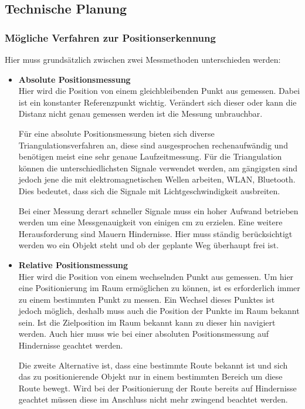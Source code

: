 \needspace{2cm}
  \subsection{Technische Planung}
    \subsubsection{Mögliche Verfahren zur Positionserkennung}
    Hier muss grundsätzlich zwischen zwei Messmethoden unterschieden werden:
    \begin{itemize}
      \item \textbf{Absolute Positionsmessung}\\
      Hier wird die Position von einem gleichbleibenden Punkt aus gemessen. Dabei ist ein konstanter Referenzpunkt wichtig.
      Verändert sich dieser oder kann die Distanz nicht genau gemessen werden ist die Messung unbrauchbar.

      Für eine absolute Positionsmessung bieten sich diverse Triangulationsverfahren an,
      diese sind ausgesprochen rechenaufwändig und benötigen meist eine sehr genaue Laufzeitmessung.
      Für die Triangulation können die unterschiedlichsten Signale verwendet werden, am gängigsten sind jedoch jene die mit elektromagnetischen Wellen arbeiten,
      \zB WLAN, Bluetooth. Dies bedeutet, dass sich die Signale mit Lichtgeschwindigkeit ausbreiten.

      Bei einer Messung derart schneller Signale muss ein hoher Aufwand betrieben werden um eine Messgenauigkeit von einigen cm zu erzielen.
      Eine weitere Herausforderung sind Mauern \bzw Hindernisse. Hier muss ständig berücksichtigt werden wo ein Objekt steht und ob der geplante Weg überhaupt frei ist.
      \item \textbf{Relative Positionsmessung}\\
      Hier wird die Position von einem wechselnden Punkt aus gemessen. Um hier eine Positionierung im Raum ermöglichen zu können,
      ist es erforderlich immer zu einem bestimmten Punkt zu messen. Ein Wechsel dieses Punktes ist jedoch möglich,
      deshalb muss auch die Position der Punkte im Raum bekannt sein. Ist die Zielposition im Raum bekannt kann zu dieser hin navigiert werden.
      Auch hier muss wie bei einer absoluten Positionsmessung auf Hindernisse geachtet werden.

      Die zweite Alternative ist, dass eine bestimmte Route bekannt ist und sich das zu positionierende Objekt nur in einem bestimmten Bereich um diese Route bewegt.
      Wird bei der Positionierung der Route bereits auf Hindernisse geachtet müssen diese im Anschluss nicht mehr zwingend beachtet werden.
    \end{itemize}

